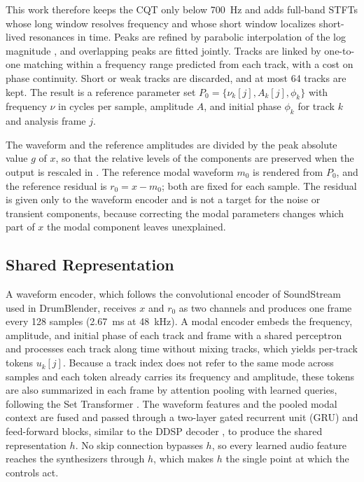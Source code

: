 This work therefore keeps the CQT only below 700~Hz and adds full-band STFTs whose long window resolves frequency and whose short window localizes short-lived resonances in time.
Peaks are refined by parabolic interpolation of the log magnitude \citep{smith1987parshl}, and overlapping peaks are fitted jointly.
Tracks are linked by one-to-one matching within a frequency range predicted from each track, with a cost on phase continuity.
Short or weak tracks are discarded, and at most 64 tracks are kept.
The result is a reference parameter set $P_0=\{\nu_k[j], A_k[j], \phi_k\}$ with frequency $\nu$ in cycles per sample, amplitude $A$, and initial phase $\phi_k$ for track $k$ and analysis frame $j$.

The waveform and the reference amplitudes are divided by the peak absolute value $g$ of $x$, so that the relative levels of the components are preserved when the output is rescaled in .
The reference modal waveform $m_0$ is rendered from $P_0$, and the reference residual is $r_0=x-m_0$; both are fixed for each sample.
The residual is given only to the waveform encoder and is not a target for the noise or transient components, because correcting the modal parameters changes which part of $x$ the modal component leaves unexplained.

\subsection{Shared Representation}
\label{sec:method-encoder}
A waveform encoder, which follows the convolutional encoder of SoundStream \citep{zeghidour2022soundstream} used in DrumBlender, receives $x$ and $r_0$ as two channels and produces one frame every 128 samples (2.67~ms at 48~kHz).
A modal encoder embeds the frequency, amplitude, and initial phase of each track and frame with a shared perceptron and processes each track along time without mixing tracks, which yields per-track tokens $u_k[j]$.
Because a track index does not refer to the same mode across samples and each token already carries its frequency and amplitude, these tokens are also summarized in each frame by attention pooling with learned queries, following the Set Transformer \citep{lee2019set}. 
The waveform features and the pooled modal context are fused and passed through a two-layer gated recurrent unit (GRU) \citep{cho2014learning} and feed-forward blocks, similar to the DDSP decoder \citep{engel2020ddsp}, to produce the shared representation $h$.
No skip connection bypasses $h$, so every learned audio feature reaches the synthesizers through $h$, which makes $h$ the single point at which the controls act.

